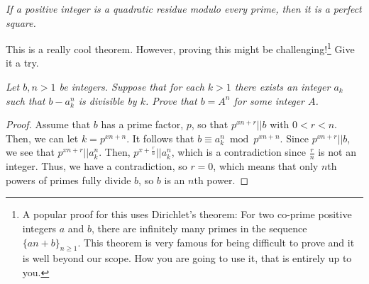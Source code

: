 \documentclass[12pt]{subfile}
\begin{document}
		\begin{theorem}\slshape
			If a positive integer is a quadratic residue modulo every prime, then it is a perfect square. 
		\end{theorem}
	This is a really cool theorem. However, proving this might be challenging!\footnote{A popular proof for this uses Dirichlet's theorem: For two co-prime positive integers $a$ and $b$, there are infinitely many primes in the sequence $\{an+b\}_{n\geq1}$. This theorem is very famous for being difficult to prove and it is well beyond our scope. How you are going to use it, that is entirely up to you.} Give it a try.
		\begin{theorem}\slshape
			Let $b,n > 1$ be integers. Suppose that for each $k > 1$ there exists an integer $a_k$ such that $b - a^n_k$ is divisible by $k$. Prove that $b = A^n$ for some integer $A$.
		\end{theorem}
		
		\begin{proof}
			Assume that $ b$ has a prime factor, $ p$, so that $ p^{xn + r}||b$ with $ 0 < r < n$. Then, we can let $ k = p^{xn + n}$. It follows that $ b\equiv a_k^n\bmod p^{xn + n}$. Since $ p^{xn + r}||b$, we see that $ p^{xn + r}||a_k^n$. Then, $ p^{x + \frac {r}{n}}||a_k^n$, which is a contradiction since $ \frac {r}{n}$ is not an integer. Thus, we have a contradiction, so $ r = 0$, which means that only $ n$th powers of primes fully divide $ b$, so $ b$ is an $ n$th power.
		\end{proof}
		

	
\end{document}
